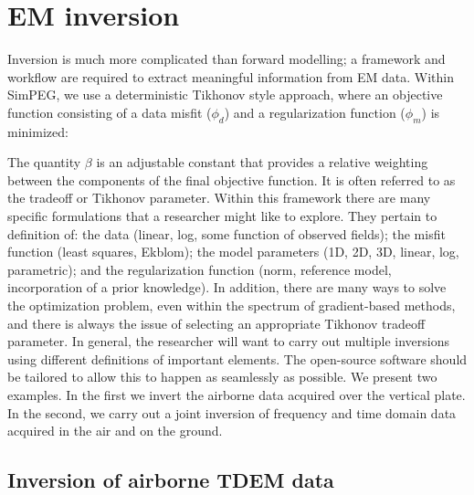 \documentclass[paper]{geophysics}
\begin{document}




\section{EM inversion}

Inversion is much more complicated than forward modelling; a framework and  workflow are required to extract meaningful information from EM data. Within SimPEG, we use a deterministic Tikhonov style approach, where an objective function consisting of a data misfit ($\phi_d$) and a regularization function ($\phi_m$) is minimized:

The quantity $\beta$ is an adjustable constant that provides a relative weighting between the components of the final objective function. It is often referred to as the tradeoff or Tikhonov parameter. Within this framework there are many specific formulations that a researcher might like to explore. They pertain to definition of: the data (linear, log, some function of observed fields); the misfit function (least squares, Ekblom); the model parameters (1D, 2D, 3D, linear, log, parametric); and the regularization function (norm,  reference model, incorporation of a prior knowledge). In addition, there are many ways to solve the optimization problem, even within the spectrum of gradient-based methods, and there is always the issue of selecting an appropriate Tikhonov tradeoff parameter. In general, the researcher will want to carry out multiple inversions using different definitions of important elements. The open-source software should be tailored to allow this to happen as seamlessly as possible. We present two examples. In the first we invert the airborne data acquired over the vertical plate. In the second, we carry out a joint inversion of frequency and time domain data acquired in the air and on the ground.


\subsection{Inversion of airborne TDEM data}
\end{document}
